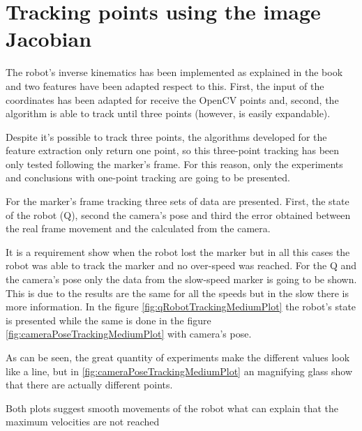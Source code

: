 %






\chapter{Tracking points using the image Jacobian} %
\label{chap:tracking_points_using_the_image_jacobian}
The robot's inverse kinematics has been implemented as explained in the book and two features have been adapted respect to this. 
First, the input of the coordinates has been adapted for receive the OpenCV points and, second, the algorithm is able to track until three points (however, is easily expandable).

Despite it's possible to track three points, the algorithms developed for the feature extraction only return one point, so this three-point tracking has been only tested following the marker's frame. 
For this reason, only the experiments and conclusions with one-point tracking are going to be presented.

For the marker's frame tracking three sets of data are presented. 
First, the state of the robot (Q), second the camera's pose and third the error obtained between the real frame movement and the calculated from the camera.

It is a requirement show when the robot lost the marker but in all this cases the robot was able to track the marker and no over-speed was reached. 
For the Q and the camera's pose only the data from the slow-speed marker is going to be shown. 
This is due to the results are the same for all the speeds but in the slow there is more information.
In the figure \ref{fig:qRobotTrackingMediumPlot} the robot's state is presented while the same is done in the figure \ref{fig:cameraPoseTrackingMediumPlot} with camera's pose.

	\ifx \plots \yes
		\qRobotTrackingMediumPlot
	\fi
	\ifx \plots \yes
		\cameraPoseTrackingMediumPlot
	\fi
	\ifx \plots \yes
		\speedTrackingMediumPlot
	\fi

As can be seen, the great quantity of experiments make the different values look like a line, but in \ref{fig:cameraPoseTrackingMediumPlot} an magnifying glass show that there are actually different points.

Both plots suggest smooth movements of the robot what can explain that the maximum velocities are not reached

